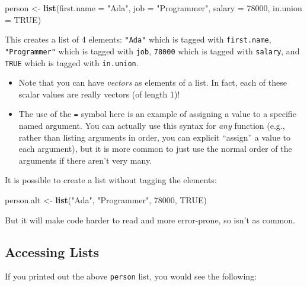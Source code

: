 \documentclass[]{book}
\newenvironment{Shaded}{\begin{snugshade}}{\end{snugshade}}
\newcommand{\KeywordTok}[1]{\textcolor[rgb]{0.13,0.29,0.53}{\textbf{#1}}}
\newcommand{\DataTypeTok}[1]{\textcolor[rgb]{0.13,0.29,0.53}{#1}}
\newcommand{\DecValTok}[1]{\textcolor[rgb]{0.00,0.00,0.81}{#1}}
\newcommand{\StringTok}[1]{\textcolor[rgb]{0.31,0.60,0.02}{#1}}
\newcommand{\OtherTok}[1]{\textcolor[rgb]{0.56,0.35,0.01}{#1}}
\newcommand{\NormalTok}[1]{#1}
\theoremstyle{definition}
\theoremstyle{definition}
\theoremstyle{remark}
\begin{document}
\begin{Shaded}
\begin{Highlighting}[]
\NormalTok{person <-}\StringTok{ }\KeywordTok{list}\NormalTok{(}\DataTypeTok{first.name =} \StringTok{"Ada"}\NormalTok{, }\DataTypeTok{job =} \StringTok{"Programmer"}\NormalTok{, }\DataTypeTok{salary =} \DecValTok{78000}\NormalTok{, }\DataTypeTok{in.union =} \OtherTok{TRUE}\NormalTok{)}
\end{Highlighting}
\end{Shaded}

This creates a list of 4 elements: \texttt{"Ada"} which is tagged with
\texttt{first.name}, \texttt{"Programmer"} which is tagged with
\texttt{job}, \texttt{78000} which is tagged with \texttt{salary}, and
\texttt{TRUE} which is tagged with \texttt{in.union}.

\begin{itemize}
\item
  Note that you can have \emph{vectors} as elements of a list. In fact,
  each of these scalar values are really vectors (of length 1)!
\item
  The use of the \texttt{=} symbol here is an example of assigning a
  value to a specific named argument. You can actually use this syntax
  for \emph{any} function (e.g., rather than listing arguments in order,
  you can explicit ``assign'' a value to each argument), but it is more
  common to just use the normal order of the arguments if there aren't
  very many.
\end{itemize}

It is possible to create a list without tagging the elements:

\begin{Shaded}
\begin{Highlighting}[]
\NormalTok{person.alt <-}\StringTok{ }\KeywordTok{list}\NormalTok{(}\StringTok{"Ada"}\NormalTok{, }\StringTok{"Programmer"}\NormalTok{, }\DecValTok{78000}\NormalTok{, }\OtherTok{TRUE}\NormalTok{)}
\end{Highlighting}
\end{Shaded}

But it will make code harder to read and more error-prone, so isn't as
common.

\subsection{Accessing Lists}\label{accessing-lists}

If you printed out the above \texttt{person} list, you would see the
following:
\end{document}
